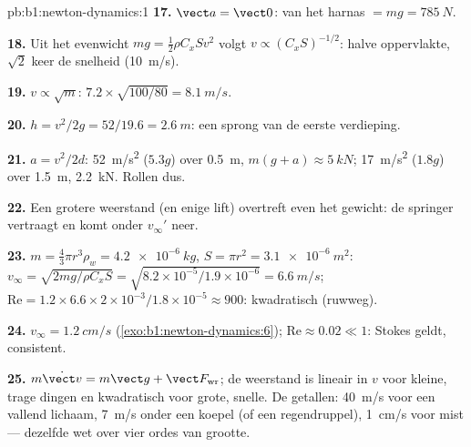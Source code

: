 \begin{solution}{pb:b1:newton-dynamics:1}
\textbf{17.} $\vect a = \vect 0$:  van het harnas $= mg = \qty{785}{N}$.

\textbf{18.} Uit het evenwicht $mg = \tfrac12\rho C_xSv^2$ volgt $v \propto (C_xS)^{-1/2}$:
halve oppervlakte, $\sqrt2$ keer de snelheid (\qty{10}{m/s}).

\textbf{19.} $v \propto \sqrt m$: $7.2 \times \sqrt{100/80} = \qty{8.1}{m/s}$.

\textbf{20.} $h = v^2/2g = 52/19.6 = \qty{2.6}{m}$: een sprong van de eerste
verdieping.

\textbf{21.} $a = v^2/2d$: \qty{52}{m/s^2} ($5.3g$) over \qty{0.5}{m},
 $m(g + a) \approx \qty{5}{kN}$; \qty{17}{m/s^2} ($1.8g$) over
\qty{1.5}{m}, \qty{2.2}{kN}. Rollen dus.

\textbf{22.} Een grotere weerstand (en enige lift) overtreft even het
gewicht: de springer vertraagt en komt onder $v_\infty'$ neer.

\textbf{23.} $m = \tfrac43\pi r^3\rho_w = \qty{4.2e-6}{kg}$, $S = \pi r^2 =
\qty{3.1e-6}{m^2}$: $v_\infty = \sqrt{2mg/\rho C_xS} = \sqrt{8.2\times10^{-5}/
1.9\times10^{-6}} = \qty{6.6}{m/s}$; $\mathrm{Re} = 1.2 \times 6.6 \times
2\times10^{-3}/1.8\times10^{-5} \approx 900$: kwadratisch (ruwweg).

\textbf{24.} $v_\infty = \qty{1.2}{cm/s}$ (\cref{exo:b1:newton-dynamics:6});
$\mathrm{Re} \approx 0.02 \ll 1$: Stokes geldt, consistent.

\textbf{25.} $m\dot{\vect v} = m\vect g + \vect F_{\text{wr}}$; de weerstand is lineair
in $v$ voor kleine, trage dingen en kwadratisch voor grote, snelle. De
getallen: \qty{40}{m/s} voor een vallend lichaam, \qty{7}{m/s} onder een koepel
(of een regendruppel), \qty{1}{cm/s} voor mist --- dezelfde wet over vier
ordes van grootte.
\end{solution}
